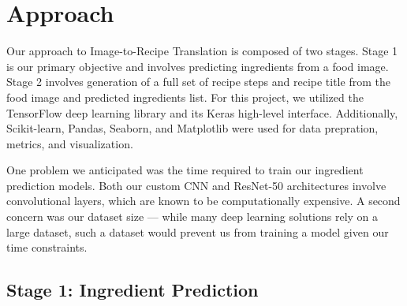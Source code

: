 \documentclass[10pt,twocolumn,letterpaper]{article}
\begin{document}



\section{Approach}

Our approach to Image-to-Recipe Translation is composed of two stages. Stage 1 is our primary objective and involves predicting ingredients from a food image. Stage 2 involves generation of a full set of recipe steps and recipe title from the food image and predicted ingredients list. For this project, we utilized the TensorFlow deep learning library and its Keras high-level interface. Additionally, Scikit-learn, Pandas, Seaborn, and Matplotlib were used for data prepration, metrics, and visualization.

One problem we anticipated was the time required to train our ingredient prediction models. Both our custom CNN and ResNet-50 architectures involve convolutional layers, which are known to be computationally expensive. A second concern was our dataset size --- while many deep learning solutions rely on a large dataset, such a dataset would prevent us from training a model given our time constraints.

\subsection{Stage 1: Ingredient Prediction}
\end{document}
